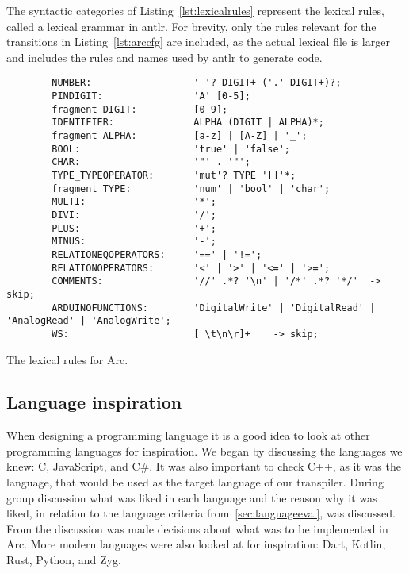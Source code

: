 The syntactic categories of Listing~\ref{lst:lexicalrules} represent the lexical rules, called a lexical grammar in \gls{antlr}. For brevity, only the rules relevant for the transitions in Listing~\ref{lst:arccfg} are included, as the actual lexical file is larger and includes the rules and names used by \gls{antlr} to generate code.


\begin{listing}[htb!]
    \begin{verbatim}
        NUMBER:                  '-'? DIGIT+ ('.' DIGIT+)?;
        PINDIGIT:                'A' [0-5];
        fragment DIGIT:          [0-9];
        IDENTIFIER:              ALPHA (DIGIT | ALPHA)*;
        fragment ALPHA:          [a-z] | [A-Z] | '_';
        BOOL:                    'true' | 'false';
        CHAR:                    '"' . '"';
        TYPE_TYPEOPERATOR:       'mut'? TYPE '[]'*;
        fragment TYPE:           'num' | 'bool' | 'char';
        MULTI:                   '*';
        DIVI:                    '/';
        PLUS:                    '+';
        MINUS:                   '-';
        RELATIONEQOPERATORS:     '==' | '!=';
        RELATIONOPERATORS:       '<' | '>' | '<=' | '>=';
        COMMENTS:                '//' .*? '\n' | '/*' .*? '*/'  -> skip;
        ARDUINOFUNCTIONS:        'DigitalWrite' | 'DigitalRead' | 'AnalogRead' | 'AnalogWrite';
        WS:                      [ \t\n\r]+    -> skip;
    \end{verbatim}
    \caption{The lexical rules for Arc.}
    \label{lst:lexicalrules}
\end{listing}


\subsection{Language inspiration}\label{sec:inspiration}
When designing a programming language it is a good idea to look at other programming languages for inspiration. We began by discussing the languages we knew: C, JavaScript, and C\#. It was also important to check C++, as it was the language, that would be used as the target language of our transpiler. During group discussion what was liked in each language and the reason why it was liked, in relation to the language criteria from~\ref{sec:languageeval}, was discussed. From the discussion was made decisions about what was to be implemented in Arc. More modern languages were also looked at for inspiration: Dart, Kotlin, Rust, Python, and Zyg.

